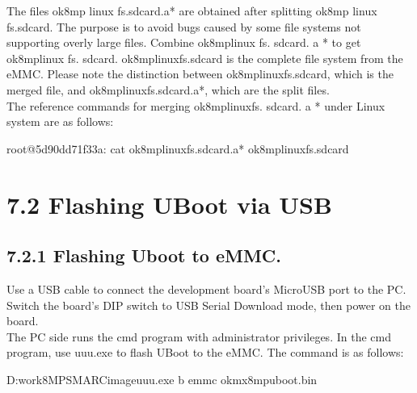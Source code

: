 \documentclass[letterpaper,10pt,openany,english]{sphinxmanual}
\begin{document}
\sphinxAtStartPar
The files ok8mp \sphinxhyphen{} linux \sphinxhyphen{} fs.sdcard.a* are obtained after splitting ok8mp \sphinxhyphen{} linux \sphinxhyphen{} fs.sdcard. The purpose is to avoid bugs caused by some file systems not supporting overly large files. Combine ok8mp\sphinxhyphen{}linux\sphinxhyphen{} fs. sdcard. a * to get ok8mp\sphinxhyphen{}linux\sphinxhyphen{} fs. sdcard. ok8mp\sphinxhyphen{}linux\sphinxhyphen{}fs.sdcard is the complete file system from the eMMC. Please note the distinction between ok8mp\sphinxhyphen{}linux\sphinxhyphen{}fs.sdcard, which is the merged file, and ok8mp\sphinxhyphen{}linux\sphinxhyphen{}fs.sdcard.a*, which are the split files.\\
The reference commands for merging ok8mp\sphinxhyphen{}linux\sphinxhyphen{}fs. sdcard. a * under Linux system are as follows:

\begin{sphinxVerbatim}[commandchars=\\\{\}]
root@5d90dd71f33a:\PYGZti{}\PYGZsh{} cat ok8mp\PYGZhy{}linux\PYGZhy{}fs.sdcard.a* \PYGZgt{} ok8mp\PYGZhy{}linux\PYGZhy{}fs.sdcard
\end{sphinxVerbatim}


\section{7.2 Flashing U\sphinxhyphen{}Boot via USB}
\label{\detokenize{linux-manual:flashing-u-boot-via-usb}}

\subsection{7.2.1 Flashing Uboot to eMMC.}
\label{\detokenize{linux-manual:flashing-uboot-to-emmc}}
\sphinxAtStartPar
Use a USB cable to connect the development board’s Micro\sphinxhyphen{}USB port to the PC. Switch the board’s DIP switch to USB Serial Download mode, then power on the board.\\
The PC side runs the cmd program with administrator privileges. In the cmd program, use uuu.exe to flash U\sphinxhyphen{}Boot to the eMMC. The command is as follows:

\begin{sphinxVerbatim}[commandchars=\\\{\}]
D:\PYGZbs{}work\PYGZbs{}8MP\PYGZus{}SMARC\PYGZbs{}image\PYGZgt{}uuu.exe \PYGZhy{}b emmc ok\PYGZhy{}mx8mp\PYGZhy{}uboot.bin
\end{sphinxVerbatim}
\end{document}
